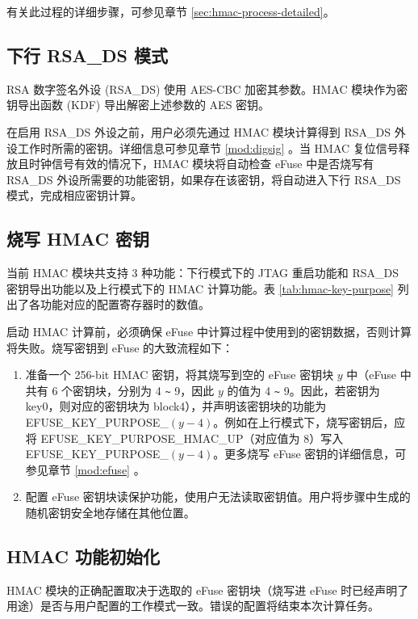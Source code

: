 \documentclass[main\_\_CN.tex]{subfiles}
\begin{document}
有关此过程的详细步骤，可参见章节 \ref{sec:hmac-process-detailed}。

\subsection{下行 RSA\_DS 模式}

RSA 数字签名外设 (RSA\_DS) 使用 AES-CBC 加密其参数。HMAC 模块作为密钥导出函数 (KDF) 导出解密上述参数的 AES 密钥。

在启用 RSA\_DS 外设之前，用户必须先通过 HMAC 模块计算得到 RSA\_DS 外设工作时所需的密钥。详细信息可参见章节 \ref{mod:digsig} \textit{}。当 HMAC 复位信号释放且时钟信号有效的情况下，HMAC 模块将自动检查 eFuse 中是否烧写有 RSA\_DS 外设所需要的功能密钥，如果存在该密钥，将自动进入下行 RSA\_DS 模式，完成相应密钥计算。

\subsection{烧写 HMAC 密钥}
\label{sec:hmac-config-function}

当前 HMAC 模块共支持 3 种功能：下行模式下的 JTAG 重启功能和 RSA\_DS 密钥导出功能以及上行模式下的 HMAC 计算功能。表 \ref{tab:hmac-key-purpose} 列出了各功能对应的配置寄存器时的数值。



启动 HMAC 计算前，必须确保 eFuse 中计算过程中使用到的密钥数据，否则计算将失败。烧写密钥到 eFuse 的大致流程如下：

\begin{enumerate}
    \item 准备一个 256-bit HMAC 密钥，将其烧写到空的 eFuse 密钥块 $y$ 中（eFuse 中共有 6 个密钥块，分别为 4 \verb+~+ 9，因此 $y$ 的值为 4 \verb+~+ 9。因此，若密钥为 key0，则对应的密钥块为 block4），并声明该密钥块的功能为\\ EFUSE\_KEY\_PURPOSE\_$(y-4)$。例如在上行模式下，烧写密钥后，应将 EFUSE\_KEY\_PURPOSE\_HMAC\_UP（对应值为 8）写入 EFUSE\_KEY\_PURPOSE\_$(y-4)$。更多烧写 eFuse 密钥的详细信息，可参见章节 \ref{mod:efuse} \textit{}。
    \item 配置 eFuse 密钥块读保护功能，使用户无法读取密钥值。用户将步骤中生成的随机密钥安全地存储在其他位置。
\end{enumerate}

\subsection{HMAC 功能初始化}
 HMAC 模块的正确配置取决于选取的 eFuse 密钥块（烧写进 eFuse 时已经声明了用途）是否与用户配置的工作模式一致。错误的配置将结束本次计算任务。
\end{document}
